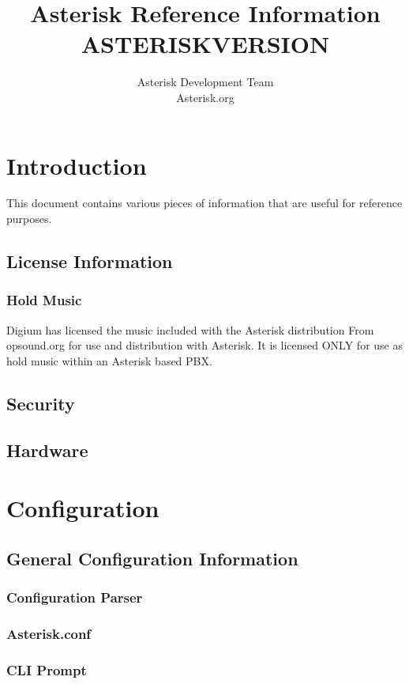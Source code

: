 \documentclass[12pt,a4]{report}
\author{Asterisk Development Team \\ Asterisk.org}
\title{Asterisk Reference Information \\ ASTERISKVERSION}
\begin{document}
\maketitle

\tableofcontents

\chapter{Introduction}

This document contains various pieces of information that are useful for
reference purposes.

  \section{License Information}
  
     \subsection{Hold Music}
       Digium has licensed the music included with
       the Asterisk distribution From opsound.org
       for use and distribution with Asterisk.  It
       is licensed ONLY for use as hold music within
       an Asterisk based PBX.
  \section{Security}
  
  \section{Hardware}
  

\chapter{Configuration}
  \section{General Configuration Information}
    \subsection{Configuration Parser}
    
    \subsection{Asterisk.conf}
    
    \subsection{CLI Prompt}
    
\end{document}
